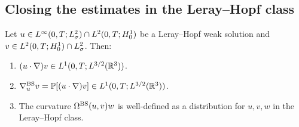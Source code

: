 \subsection{Closing the estimates in the Leray--Hopf class}

\begin{proposition}\label{prop:conn-leray-hopf}
  Let $u \in L^{\infty}(0,T;L^{2}_\sigma) \cap L^{2}(0,T;H^{1}_0)$ be a Leray--Hopf weak
  solution and $v \in L^{2}(0,T;H^{1}_0) \cap L^{2}_\sigma$.  Then:
  \begin{enumerate}[label=(\roman*)]
    \item $(u \cdot \nabla)v \in L^{1}(0,T;L^{3/2}(\mathbb{R}^3))$.
    \item $\nabla^{\mathrm{BS}}_u v = \mathbb{P}[(u \cdot \nabla)v] \in L^{1}(0,T;L^{3/2}(\mathbb{R}^3))$.
    \item The curvature $\Omega^{\mathrm{BS}}(u,v)w$ is well-defined as a distribution for
      $u, v, w$ in the Leray--Hopf class.
  \end{enumerate}
\end{proposition}


